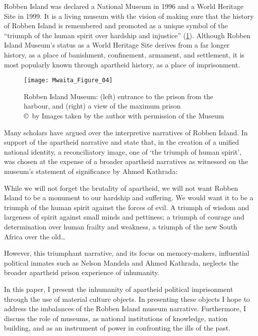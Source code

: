 Robben Island was declared a National Museum in 1996 and a World Heritage Site in 1999. It is a living museum with the vision of making sure that the history of Robben Island is remembered and promoted as a unique symbol of the “triumph of the human spirit over hardship and injustice” \parencite{Robben_2012} (\cref{fig:Mwaita_Figure_04}). Although Robben Island Museum’s status as a World Heritage Site derives from a far longer history, as a place of banishment, confinement, armament, and settlement, it is most popularly known through apartheid history, as a place of imprisonment.

\begin{figure}[!tb]
	\texttt{[image: Mwaita\_Figure\_04]}
	\caption{Robben Island Museum: (left) entrance to the prison from the harbour, and (right) a view of the maximum prison
  {\normalfont\scriptsize \\ \copyright\ by
Images taken by the author with permission of the Museum
                    }}
  	\label{fig:Mwaita_Figure_04}
\end{figure}

Many scholars \parencites{Hutton_1997}{Nesje_2005}{Rioufol_2000}{Solani_2000} have argued over the interpretive narratives of Robben Island. In support of the apartheid narrative \textcite{Rioufol_2000} and \textcite{Solani_2000} state that, in the creation of a unified national identity, a reconciliatory image, one of ‘the triumph of human spirit’, was chosen at the expense of a broader apartheid narratives as witnessed on the museum’s statement of significance by Ahmed Kathrada:
\begin{IJSRAquote}{\cite[17]{Robben_2012}}
    {While we will not forget the brutality of apartheid, we will not want Robben Island to be a monument to our hardship and suffering. We would want it to be a triumph of the human spirit against the forces of evil. A triumph of wisdom and largeness of spirit against small minds and pettiness; a triumph of courage and determination over human frailty and weakness, a triumph of the new South Africa over the old… }
\end{IJSRAquote}
However, this triumphant narrative, and its focus on memory-makers, influential political inmates such as Nelson Mandela and Ahmed Kathrada, neglects the broader apartheid prison experience of inhumanity.

In this paper, I present the inhumanity of apartheid political imprisonment through the use of material culture objects. In presenting these objects I hope to address the imbalances of the Robben Island museum narrative. Furthermore, I discuss the role of museums, as national institutions of knowledge, nation building, and as an instrument of power in confronting the ills of the past.

